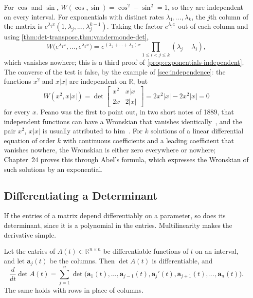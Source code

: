 For $\cos$ and $\sin$, $W(\cos,\sin)=\cos^2+\sin^2=1$, so they are independent on every interval. For exponentials with distinct rates $\lambda_1,\ldots,\lambda_k$, the $j$th column of the matrix is $e^{\lambda_jx}(1,\lambda_j,\ldots,\lambda_j^{k-1})$. Taking the factor $e^{\lambda_jx}$ out of each column and using \cref{thm:det-transpose,thm:vandermonde-det},
\[
W\bigl(e^{\lambda_1x},\ldots,e^{\lambda_kx}\bigr)=e^{(\lambda_1+\cdots+\lambda_k)x}\prod_{1\le i<j\le k}(\lambda_j-\lambda_i),
\]
which vanishes nowhere; this is a third proof of \cref{prop:exponentials-independent}. The converse of the test is false, by the example of \cref{sec:independence}: the functions $x^2$ and $x|x|$ are independent on $\mathbb R$, but
\[
W(x^2,x|x|)=\det\begin{bmatrix}x^2&x|x|\\2x&2|x|\end{bmatrix}=2x^2|x|-2x^2|x|=0
\]
for every $x$. Peano was the first to point out, in two short notes of 1889, that independent functions can have a Wronskian that vanishes identically~\cite{peano1889wronskien,peano1889wronskiens}, and the pair $x^2$, $x|x|$ is usually attributed to him~\cite{bostan2010}. For $k$ solutions of a linear differential equation of order $k$ with continuous coefficients and a leading coefficient that vanishes nowhere, the Wronskian is either zero everywhere or nowhere; Chapter~24 proves this through Abel's formula, which expresses the Wronskian of such solutions by an exponential.

\subsection{Differentiating a Determinant}

If the entries of a matrix depend differentiably on a parameter, so does its determinant, since it is a polynomial in the entries. Multilinearity makes the derivative simple.

\begin{proposition}
\label{prop:det-derivative}
Let the entries of $A(t)\in\mathbb R^{n\times n}$ be differentiable functions of $t$ on an interval, and let $\mathbf a_j(t)$ be the columns. Then $\det A(t)$ is differentiable, and
\[
\frac{d}{dt}\det A(t)=\sum_{j=1}^n\det\bigl(\mathbf a_1(t),\ldots,\mathbf a_{j-1}(t),\mathbf a_j'(t),\mathbf a_{j+1}(t),\ldots,\mathbf a_n(t)\bigr).
\]
The same holds with rows in place of columns.
\end{proposition}


